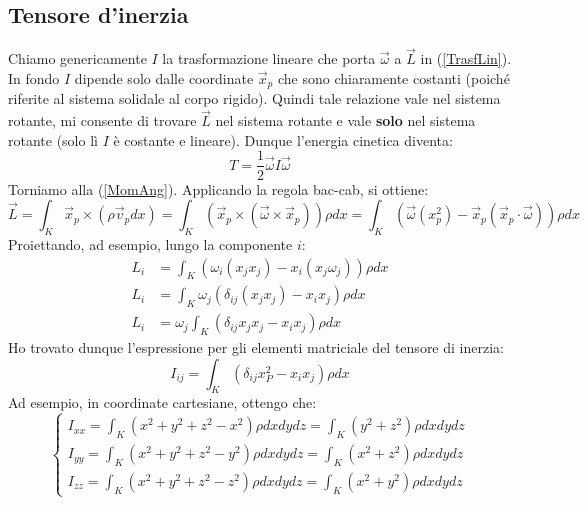 \documentclass[a4paper,openany]{article}
\begin{document}
	\subsection{Tensore d'inerzia}
	Chiamo genericamente $I$ la trasformazione lineare che porta $\vec{\omega}$ a $\vec{L}$ in (\ref{TrasfLin}). In fondo $I$ dipende solo dalle coordinate $\vec{x}_{p}$ che sono chiaramente costanti (poiché riferite al sistema solidale al corpo rigido). Quindi tale relazione vale nel sistema rotante, mi consente di trovare $\vec{L}$ nel sistema rotante e vale \textbf{solo} nel sistema rotante (solo lì $I$ è costante e lineare). Dunque l'energia cinetica diventa:
	\begin{equation}\label{key}
		T = \dfrac{1}{2}\vec{\omega}I\vec{\omega}
	\end{equation}
	Torniamo alla (\ref{MomAng}). Applicando la regola bac-cab, si ottiene:
	\begin{equation}
		\vec{L} = \int_{K} \vec{x}_{p}\times(\rho \vec{v}_{p}dx) =  \int_{K}(\vec{x}_{p}\times(\vec{\omega}\times\vec{x}_{p}))\rho dx
		= \int_{K}(\vec{\omega}(x_{p}^{2}) - \vec{x}_{p}(\vec{x}_{p}\cdot\vec{\omega}))\rho dx
	\end{equation}
	Proiettando, ad esempio, lungo la componente $i$:
	\begin{equation}
		\begin{aligned}
			L_i &=  \int_{K}(\omega_{i}(x_{j}x_{j}) - x_{i}(x_{j}\omega_j))\rho dx \\
			L_i &=  \int_{K}\omega_j (\delta_{ij}(x_{j}x_{j}) - x_{i}x_{j})\rho dx  \\
			L_i &=  \omega_j \int_{K} (\delta_{ij}x_{j}x_{j} - x_{i}x_{j})\rho dx 
		\end{aligned}
	\end{equation}
	Ho trovato dunque l'espressione per gli elementi matriciale del tensore di inerzia:
	\begin{equation}\label{key}
		I_{ij} = \int_{K} (\delta_{ij}x_{P}^{2} - x_{i}x_{j})\rho dx  
	\end{equation}
	Ad esempio, in coordinate cartesiane, ottengo che:
	\begin{equation}\label{key}
		\begin{cases}
			I_{xx} = \int_{K}(x^{2}+y^{2}+z^{2}-x^{2})\rho dxdydz = \int_{K}(y^{2}+z^{2})\rho dxdydz \\
			I_{yy} = \int_{K}(x^{2}+y^{2}+z^{2}-y^{2})\rho dxdydz = \int_{K}(x^{2}+z^{2})\rho dxdydz \\
			I_{zz} = \int_{K}(x^{2}+y^{2}+z^{2}-z^{2})\rho dxdydz = \int_{K}(x^{2}+y^{2})\rho dxdydz
		\end{cases}
	\end{equation}
\end{document}
